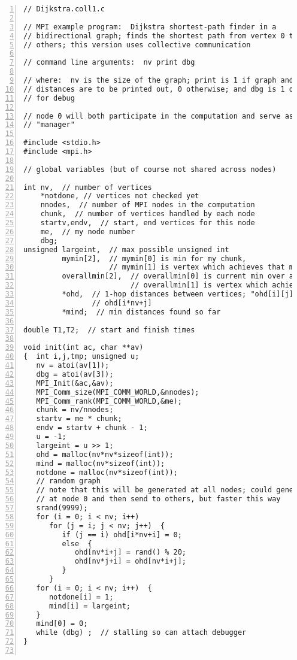 \begin{Verbatim}[fontsize=\relsize{-2},numbers=left]
// Dijkstra.coll1.c

// MPI example program:  Dijkstra shortest-path finder in a
// bidirectional graph; finds the shortest path from vertex 0 to all
// others; this version uses collective communication

// command line arguments:  nv print dbg

// where:  nv is the size of the graph; print is 1 if graph and min
// distances are to be printed out, 0 otherwise; and dbg is 1 or 0, 1
// for debug

// node 0 will both participate in the computation and serve as a
// "manager"

#include <stdio.h>
#include <mpi.h>

// global variables (but of course not shared across nodes)

int nv,  // number of vertices
    *notdone, // vertices not checked yet
    nnodes,  // number of MPI nodes in the computation
    chunk,  // number of vertices handled by each node
    startv,endv,  // start, end vertices for this node
    me,  // my node number 
    dbg; 
unsigned largeint,  // max possible unsigned int
         mymin[2],  // mymin[0] is min for my chunk,
                    // mymin[1] is vertex which achieves that min
         overallmin[2],  // overallmin[0] is current min over all nodes,
                         // overallmin[1] is vertex which achieves that min
         *ohd,  // 1-hop distances between vertices; "ohd[i][j]" is
                // ohd[i*nv+j]
         *mind;  // min distances found so far

double T1,T2;  // start and finish times 

void init(int ac, char **av)
{  int i,j,tmp; unsigned u;
   nv = atoi(av[1]);
   dbg = atoi(av[3]);
   MPI_Init(&ac,&av);
   MPI_Comm_size(MPI_COMM_WORLD,&nnodes);
   MPI_Comm_rank(MPI_COMM_WORLD,&me);
   chunk = nv/nnodes;  
   startv = me * chunk; 
   endv = startv + chunk - 1;
   u = -1;
   largeint = u >> 1;
   ohd = malloc(nv*nv*sizeof(int));
   mind = malloc(nv*sizeof(int));
   notdone = malloc(nv*sizeof(int)); 
   // random graph
   // note that this will be generated at all nodes; could generate just
   // at node 0 and then send to others, but faster this way
   srand(9999);
   for (i = 0; i < nv; i++)  
      for (j = i; j < nv; j++)  {
         if (j == i) ohd[i*nv+i] = 0;
         else  {
            ohd[nv*i+j] = rand() % 20;
            ohd[nv*j+i] = ohd[nv*i+j];
         }
      }
   for (i = 0; i < nv; i++)  {
      notdone[i] = 1;
      mind[i] = largeint;
   }
   mind[0] = 0;
   while (dbg) ;  // stalling so can attach debugger
}


\end{Verbatim}
